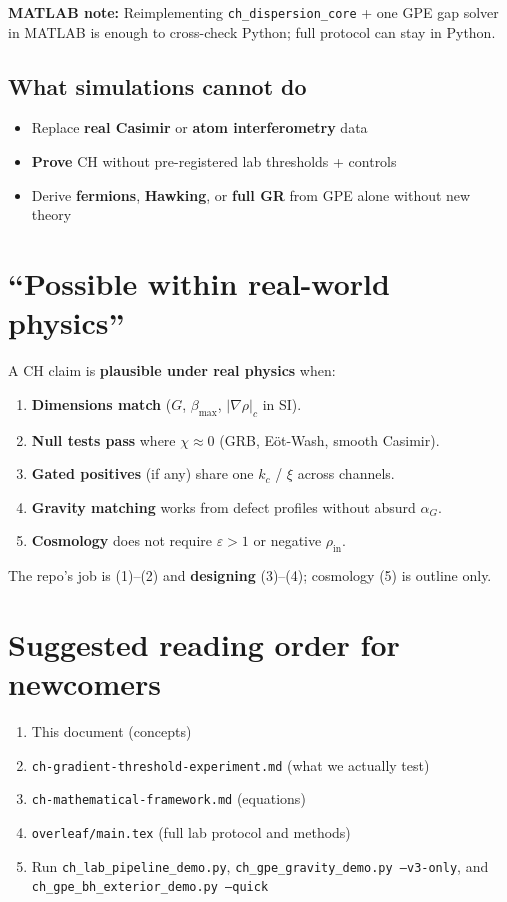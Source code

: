 \documentclass[11pt,a4paper]{article}
\begin{document}
\noindent\textbf{MATLAB note:} Reimplementing \texttt{ch\_dispersion\_core} + one GPE gap solver in MATLAB is enough to cross-check Python; full protocol can stay in Python.

\subsection{What simulations cannot do}

\begin{itemize}[leftmargin=*]
  \item Replace \textbf{real Casimir} or \textbf{atom interferometry} data
  \item \textbf{Prove} CH without pre-registered lab thresholds + controls
  \item Derive \textbf{fermions}, \textbf{Hawking}, or \textbf{full GR} from GPE alone without new theory
\end{itemize}

\section{``Possible within real-world physics''}
\label{sec:plausible}

A CH claim is \textbf{plausible under real physics} when:
\begin{enumerate}[label=\arabic*., leftmargin=*]
  \item \textbf{Dimensions match} ($G$, $\beta_{\max}$, $|\nabla\rho|_c$ in SI).
  \item \textbf{Null tests pass} where $\chi \approx 0$ (GRB, E\"ot-Wash, smooth Casimir).
  \item \textbf{Gated positives} (if any) share one $k_c$ / $\xi$ across channels.
  \item \textbf{Gravity matching} works from defect profiles without absurd $\alpha_G$.
  \item \textbf{Cosmology} does not require $\varepsilon > 1$ or negative $\rho_{\mathrm{in}}$.
\end{enumerate}

The repo's job is (1)--(2) and \textbf{designing} (3)--(4); cosmology (5) is outline only.

\section{Suggested reading order for newcomers}

\begin{enumerate}[label=\arabic*., leftmargin=*]
  \item This document (concepts)
  \item \texttt{ch-gradient-threshold-experiment.md} (what we actually test)
  \item \texttt{ch-mathematical-framework.md} (equations)
  \item \texttt{overleaf/main.tex} (full lab protocol and methods)
  \item Run \texttt{ch\_lab\_pipeline\_demo.py}, \texttt{ch\_gpe\_gravity\_demo.py --v3-only}, and \texttt{ch\_gpe\_bh\_exterior\_demo.py --quick}
\end{enumerate}
\end{document}
